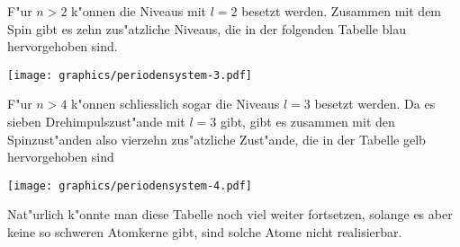 F"ur $n>2$ k"onnen die Niveaus mit $l=2$ besetzt werden. Zusammen mit
dem Spin gibt es zehn zus"atzliche Niveaus, die in der folgenden Tabelle
blau hervorgehoben sind.
\begin{center}
\texttt{[image: graphics/periodensystem-3.pdf]}
\end{center}

F"ur $n>4$ k"onnen schliesslich sogar die Niveaus $l=3$ besetzt werden.
Da es sieben Drehimpulszust"ande mit $l=3$ gibt, gibt es zusammen mit den
Spinzust"anden also vierzehn zus"atzliche Zust"ande, die in
der Tabelle gelb hervorgehoben sind
\begin{center}
\texttt{[image: graphics/periodensystem-4.pdf]}
\end{center}
Nat"urlich k"onnte man diese Tabelle noch viel weiter fortsetzen,
solange es aber keine so schweren Atomkerne gibt, sind solche Atome
nicht realisierbar.

